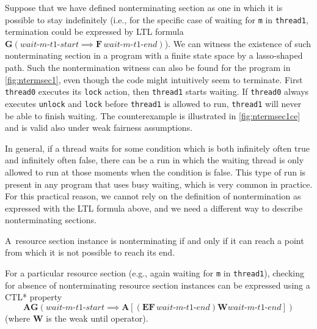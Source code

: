 Suppose that we have defined nonterminating section as one in which it is possible to stay indefinitely (i.e., for the specific case of waiting for \texttt{m} in \texttt{thread1}, termination could be expressed by LTL formula $\mathbf{G}(\textit{wait-m-t1-start} \implies \mathbf{F}\,\textit{wait-m-t1-end})$).
We can witness the existence of such nonterminating section in a program with a finite state
space by a lasso-shaped path. Such the nontermination witness can also be found
for the program in \autoref{fig:ntermsec1}, even though the code might intuitively seem to
terminate.
First \texttt{thread0} executes its \texttt{lock} action, then \texttt{thread1} starts waiting.
If \texttt{thread0} always executes \texttt{unlock} and \texttt{lock} before
\texttt{thread1} is allowed to run, \texttt{thread1} will never be able to finish waiting.
The counterexample is illustrated in \autoref{fig:ntermsec1ce} and is valid also under weak fairness assumptions.

In general, if a thread waits for some condition which is both infinitely often true and infinitely often false, there can be a run in which the waiting thread is only allowed to run at those moments when the condition is false. This type of run is present in any program that uses busy waiting, which is very common in practice.
For this practical reason, we
cannot rely on the definition of nontermination as expressed with the LTL
formula above, and we need a different way to describe nonterminating sections.
\begin{definition}\label{def:lnterm}
A~resource section instance is nonterminating if and only if it can reach a point from which it is not possible to reach its end.
\end{definition}

For a particular resource section (e.g., again waiting for \texttt{m} in \texttt{thread1}), checking for absence of nonterminating resource section instances can be expressed using a CTL* property \[ \mathbf{AG}\left(\textit{wait-m-t1-start} \implies \mathbf{A}[(\mathbf{EF}\,\textit{wait-m-t1-end}) \mathbin{\mathbf{W}} \textit{wait-m-t1-end}]\right) \] (where $\mathbf{W}$ is the weak until operator).


